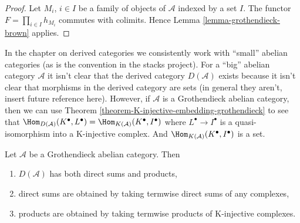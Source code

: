 \begin{proof}
Let $M_i$, $i \in I$ be a family of objects of $\mathcal{A}$ indexed
by a set $I$. The functor $F = \prod_{i \in I} h_{M_i}$
commutes with colimits. Hence
Lemma \ref{lemma-grothendieck-brown}
applies.
\end{proof}

\begin{remark}
\label{remark-existence-D}
In the chapter on derived categories we consistently work with
``small'' abelian categories (as is the convention in the stacks
project). For a ``big'' abelian category $\mathcal{A}$ it isn't clear
that the derived category $D(\mathcal{A})$ exists because it isn't
clear that morphisms in the derived category are sets (in general they
aren't, insert future reference here). However, if
$\mathcal{A}$ is a Grothendieck abelian category, then we can use
Theorem \ref{theorem-K-injective-embedding-grothendieck}
to see that
$\Hom_{D(\mathcal{A})}(K^\bullet, L^\bullet) =
\Hom_{K(\mathcal{A})}(K^\bullet, I^\bullet)$
where $L^\bullet \to I^\bullet$ is a quasi-isomorphism into a
K-injective complex. And $\Hom_{K(\mathcal{A})}(K^\bullet, I^\bullet)$
is a set.
\end{remark}

\begin{lemma}
\label{lemma-derived-products}
Let $\mathcal{A}$ be a Grothendieck abelian category.
Then
\begin{enumerate}
\item $D(\mathcal{A})$ has both direct sums and products,
\item direct sums are obtained by taking termwise direct sums of
any complexes,
\item products are obtained by taking termwise products of
K-injective complexes.
\end{enumerate}
\end{lemma}

